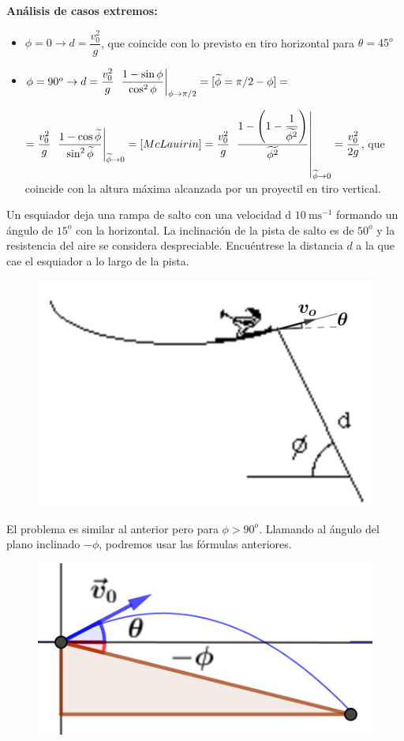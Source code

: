 \vspace{4mm} \textbf{Análisis de casos extremos:}
\begin{itemize}
\item $\phi=0 \to d=\dfrac {v_0^2} {g}$, que coincide con lo previsto en tiro horizontal para $\theta=45^o$
\item$\phi=90^o \to d= \dfrac {v_0^2}{g}\ \eval{\dfrac {1-\sin \phi}{\cos^2 \phi}}_{\phi\to \pi/2}= [ \widetilde{\phi} =\pi/2 - \phi]=$ 

$= \dfrac {v_0^2}{g}\ \eval{\dfrac {1-\cos \widetilde{\phi}}{\sin^2 \widetilde{\phi}}}_{\widetilde{\phi}\to 0}=[McLauirin]= \dfrac {v_0^2} {g} \eval{\ \dfrac {1-\left( 1-\dfrac {1}{\widetilde{\phi^2}} \right)} {\widetilde{\phi^2}}}_{\widetilde{\phi}\to 0} =\dfrac {v_0^2}{2g}$, que coincide con la altura máxima alcanzada por un proyectil en tiro vertical.
\end{itemize}

\begin{prob}
Un esquiador deja una rampa de salto con una velocidad d $10 \ \mathrm{ms}^{-1}$	formando un ángulo de $15^o$ con la horizontal. La inclinación de la pista de salto es de $50^o$ y la resistencia del aire se considera despreciable. Encuéntrese la distancia $d$ a la que cae el esquiador a lo largo de la pista.
\end{prob}

\begin{multicols}{2}

\begin{figure}[H]
		\centering
		\includegraphics[width=.5\textwidth]{imagenes/imagenes02/T02IM37.png}
		\end{figure}
El problema es similar al anterior pero para $\phi>90^o$. 
Llamando al ángulo del plano inclinado $-\phi$, podremos usar las fórmulas anteriores.

\begin{figure}[H]
		\centering
		\includegraphics[width=.3\textwidth]{imagenes/imagenes02/T02IM38.png}
		\end{figure}

\end{multicols}



